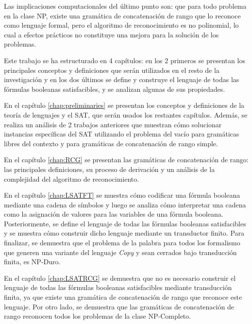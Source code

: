 Las implicaciones computacionales del último punto son: que para todo problema en la clase NP, existe una gramática
de concatenación de rango que lo reconoce como lenguaje formal, pero el algoritmo de reconocimiento es no 
polinomial, lo cual a efectos prácticos no constituye una mejora para la solución de los problemas.

Este trabajo se ha estructurado en 4 capítulos: en los 2 primeros se presentan los principales conceptos y 
definiciones que serán utilizados en el resto de la investigación y en los dos últimos se define y construye 
el lenguaje de todas las fórmulas booleanas satisfacibles, y se analizan algunas de sus propiedades.

En el capítulo \ref{chap:preliminaries} se presentan los conceptos y definiciones de la teoría de lenguajes y 
el SAT, que serán usados los restantes capítulos. Además, se realiza un análisis de 2 trabajos anteriores 
que muestran cómo solucionar instancias específicas del SAT utilizando el problema del vacío para gramáticas 
libres del contexto y para gramáticas de concatenación de rango simple.

En el capítulo \ref{chap:RCG} se presentan las gramáticas de concatenación de rango: las principales definiciones, 
su proceso de derivación y un análisis de la complejidad del algoritmo de reconocimiento.

En el capítulo \ref{chap:LSATFT} se muestra cómo codificar una fórmula booleana mediante una cadena de símbolos 
y luego se analiza cómo interpretar una cadena como la asignación de valores para las variables de una fórmula 
booleana.  Posteriormente, se define el lenguaje de todas las fórmulas booleanas satisfacibles y se muestra 
cómo construir dicho lenguaje mediante un transductor finito. Para finalizar, se demuestra que el problema de 
la palabra para todos los formalismo que generen una variante del lenguaje \textit{Copy} y sean cerrados bajo
transducción finita, es NP-Duro.

En el capítulo \ref{chap:LSATRCG} se demuestra que no es necesario construir el lenguaje de todas las 
fórmulas booleanas satisfacibles mediante transducción finita, ya que existe una gramática de concatenación 
de rango que reconoce este lenguaje. Por otro lado, se demuestra que las gramáticas de concatenación de rango 
reconocen todos los problemas de la clase NP-Completo.